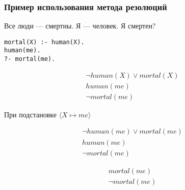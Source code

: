 \documentclass{beamer}
\begin{document}
\begin{frame}[fragile]
  \frametitle{Пример использования метода резолюций}
Все люди --- смертны. Я --- человек. Я смертен?

\begin{verbatim}
mortal(X) :- human(X).
human(me).
?- mortal(me).
\end{verbatim}

\[
  \begin{array}{c}
    \neg human(X) \vee mortal(X) \\
    human(me) \\
    \neg mortal(me)
  \end{array}
\]

При подстановке $\langle X \mapsto me \rangle$

\[
  \begin{array}{c}
    \neg human(me) \vee mortal(me) \\
    human(me) \\
    \neg mortal(me)
  \end{array}
\]

\[
  \begin{array}{c}
    mortal(me) \\
    \neg mortal(me)
  \end{array}
\]

\end{frame}





\end{document}
